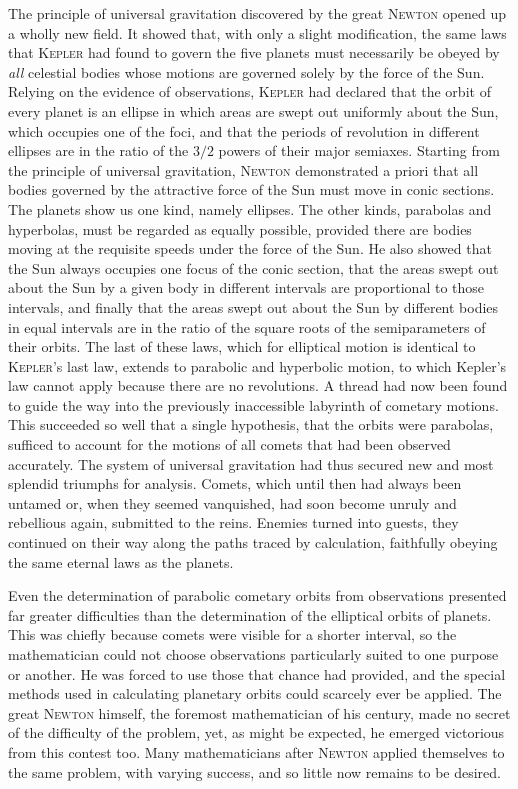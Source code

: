 The principle of universal gravitation discovered by the great \textsc{Newton} opened up a wholly new field. It showed that, with only a slight modification, the same laws that \textsc{Kepler} had found to govern the five planets must necessarily
be obeyed by \emph{all} celestial bodies whose motions are governed solely by the force of the Sun. Relying on the evidence of observations, \textsc{Kepler} had declared that the orbit of every planet is an ellipse in which areas are swept out uniformly about the Sun, which occupies one of the foci, and that the periods of revolution in different ellipses are in the ratio of the \(3/2\) powers of their major semiaxes. Starting from the principle of universal gravitation, \textsc{Newton} demonstrated a priori that all bodies governed by the attractive force of the Sun must move in conic sections. The planets show us one kind, namely ellipses. The other kinds, parabolas and hyperbolas, must be regarded as equally possible, provided there are bodies moving at the requisite speeds under the force of the Sun. He also showed that the Sun always occupies one focus of the conic section, that the areas swept out about the Sun by a given body in different intervals are proportional to those intervals, and finally that the areas swept out about the Sun by different bodies in equal intervals are in the ratio of the square roots of the semiparameters of their orbits. The last of these laws, which for elliptical motion is identical to \textsc{Kepler}'s last law, extends to parabolic and hyperbolic motion, to which Kepler's law cannot apply because there are no revolutions. A thread had now been found to guide the way into the previously inaccessible labyrinth of cometary motions. This succeeded so well that a single hypothesis, that the orbits were parabolas, sufficed to account for the motions of all comets that had been observed accurately. The system of universal gravitation had thus secured new and most splendid triumphs for analysis. Comets, which until then had always been untamed or, when they seemed vanquished, had soon become unruly and rebellious again, submitted to the reins. Enemies turned into guests, they continued on their way along the paths traced by calculation, faithfully obeying the same eternal laws as the planets.

Even the determination of parabolic cometary orbits from observations presented far greater difficulties than the determination of the elliptical orbits of planets. This was chiefly because comets were visible for a shorter
interval, so the mathematician could not choose observations particularly suited to one purpose or another. He was forced to use those that chance had provided, and the special methods used in calculating planetary orbits could scarcely ever be applied. The great \textsc{Newton} himself, the foremost mathematician of his century, made no secret of the difficulty of the problem, yet, as might be expected, he emerged victorious from this contest too. Many mathematicians after \textsc{Newton} applied themselves to the same problem, with varying success, and so little now remains to be desired.

